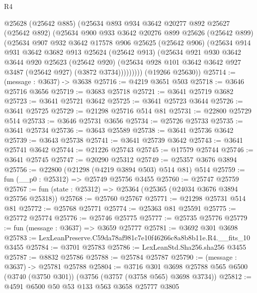 \begin{lexlean}{R4}
\begin{coremodule}
          @25628
          (@25642 @885)
          (@25634
            @893
            @934
            @3642
            @20277
            @892
            @25627
            (@25642 @892)
            (@25634
              @900
              @933
              @3642
              @20276
              @899
              @25626
              (@25642 @899)
              (@25634
                @907
                @932
                @3642
                @17578
                @906
                @25625
                (@25642 @906)
                (@25634
                  @914
                  @931
                  @3642
                  @3682
                  @913
                  @25624
                  (@25642 @913)
                  (@25634
                    @921
                    @930
                    @3642
                    @3644
                    @920
                    @25623
                    (@25642 @920)
                    (@25634 @928 @101 @3642 @3642 @927 @3487 (@25642 @927) (@3872 @3734)))))))))
      (@19266 @25630))
@25714 := (message : @3637) -> @3638
@25716 := @4219 @3651 @503
@25718 := @3646 @25716 @3656
@25719 := @3683 @25718
@25721 := @3641 @25719 @3682
@25723 := @3641 @25721 @3642
@25725 := @3641 @25723 @3644
@25726 := @3641 @25725
@25729 := @21298 @25716 @514 @81
@25731 := @22800 @25729 @514
@25733 := @3646 @25731 @3656
@25734 := @25726 @25733
@25735 := @3641 @25734
@25736 := @3643 @25589
@25738 := @3641 @25736 @3642
@25739 := @3643 @25738
@25741 := @3641 @25739 @3642
@25743 := @3641 @25741 @3642
@25744 := @21226 @25743
@25745 := @17579 @25744
@25746 := @3641 @25745
@25747 := @20290 @25312
@25749 := @25357 @3676 @3894
@25756 := @22800 (@21298 (@4219 @3894 @503) @514 @81) @514
@25759 := fun (__p0 : @25312) => @25749 @25756 @3455
@25760 := @25747 @25759
@25767 := fun (state : @25312) => @25364 (@25365 (@24034 @3676 @3894 @25756 @25318))
@25768 := @25760 @25767
@25771 := @21298 @25731 @514 @81
@25772 := @25768 @25771
@25774 := @25363 @81 @25591
@25775 := @25772 @25774
@25776 := @25746 @25775
@25777 := @25735 @25776
@25779 := fun (message : @3637) => @3659 @25777
@25781 := @3692 @301 @3698
@25783 := LexLeanPreserve.C59da78af981c7e10f46266c8a8b8b11e.R4.__fits_10 @3455
@25784 := @3701 @25783
@25786 := LexLeanStd.Sha256.sha256 @3455
@25787 := @8832 @25786
@25788 := @25784 @25787
@25790 := (message : @3637) -> @25781 @25788
@25804 := @3716
    @301
    @3698
    @25788
    @565
    @6500
    (@3740 (@3750 @301))
    (@3756 (@3757 (@3758 @565) @3698 @3734))
@25812 := @4591 @6500 @50 @53 @133 @563 @3658 @25777 @3805

\end{coremodule}
\end{lexlean}
